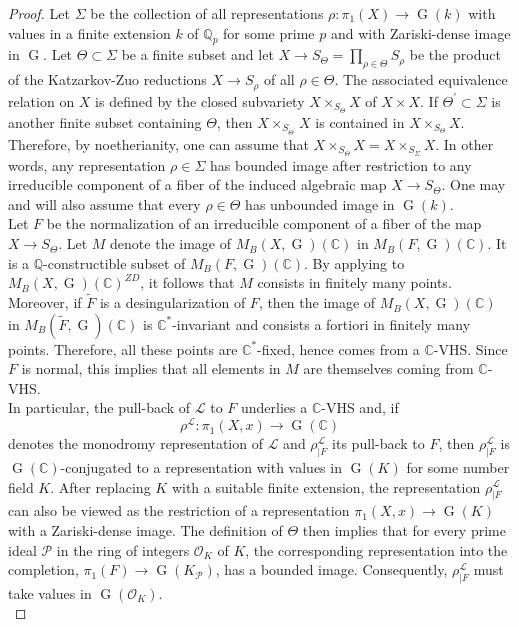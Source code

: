 \documentclass[11pt,letterpaper]{amsart}
\def\bQ{\mathbb{Q}}
\def\bC{\mathbb{C}}
\def\cL{\mathcal{L}}
\theoremstyle{plain}
\DeclareMathOperator{\rG}{G}
\begin{document}
\begin{proof}
Let $\Sigma$ be the collection of all representations $\rho \colon \pi_1(X) \rightarrow \rG(k)$ with values in a finite extension $k$ of $\bQ_p$ for some prime $p$ and with Zariski-dense image in $\rG$. Let $\Theta \subset \Sigma$ be a finite subset and let $X \to S_\Theta =  \prod_{\rho \in \Theta}  S_\rho$ be the product of the Katzarkov-Zuo reductions $X \to S_\rho$ of all $\rho \in \Theta$.
The associated equivalence relation on $X$ is defined by the closed subvariety $X \times_{S_\Theta} X$ of $X \times X$. If $\Theta^\prime \subset \Sigma$ is another finite subset containing $\Theta$, then $X \times_{S_{\Theta^\prime}} X$ is contained in $X \times_{S_\Theta} X$. Therefore, by noetherianity, one can assume that $X \times_{S_{\Theta}} X = X \times_{S_{\Sigma}} X$. In other words, any representation $\rho \in \Sigma$ has bounded image after restriction to any irreducible component of a fiber of the induced algebraic map $X \to S_\Theta$. One may and will also assume that every $\rho \in \Theta$ has unbounded image in $\rG(k)$.\\

Let $F$ be the normalization of an irreducible component of a fiber of the map $X \to S_\Theta$. Let $M$ denote the image of $M_B(X, \rG)(\bC)$ in $M_B(F,\rG)(\bC)$. It is a $\bQ$-constructible subset of $M_B(F,\rG)(\bC)$. By applying \cite[Theorem 6.8]{Brunebarbe-Shafarevich} to $M_B(X, \rG)(\bC)^{ZD}$, it follows that $M$ consists in finitely many points. Moreover, if $\tilde F$ is a desingularization of $F$, then the image of $M_B(X, \rG)(\bC)$ in $M_B(\tilde F,\rG)(\bC)$ is $\bC^\ast$-invariant and consists a fortiori in finitely many points. Therefore, all these points are $\bC^\ast$-fixed, hence comes from a $\bC$-VHS. Since $F$ is normal, this implies that all elements in $M$ are themselves coming from $\bC$-VHS.\\

In particular, the pull-back of $\cL$ to $F$ underlies a $\bC$-VHS and, if 
\[ \rho^\cL \colon \pi_1(X,x) \to \rG(\bC)\]
denotes the monodromy representation of $\cL$ and $\rho^\cL_{|F}$ its pull-back to $F$, then $\rho^\cL_{|F}$ is $\rG(\bC)$-conjugated to a representation with values in $\rG(K)$ for some number field $K$. After replacing $K$ with a suitable finite extension, the representation $\rho^\cL_{|F}$ can also be viewed as the restriction of a representation $\pi_1(X,x) \to \rG(K)$ with a Zariski-dense image. The definition of $\Theta$ then implies that for every prime ideal $\mathcal{P}$ in the ring of integers $\mathcal{O}_K$ of $K$, the corresponding representation into the completion, $\pi_1(F) \to \rG(K_\mathcal{P})$, has a bounded image. Consequently, $\rho^\cL_{|F}$ must take values in $\rG(\mathcal{O}_K)$. \\


\end{proof}
\end{document}
